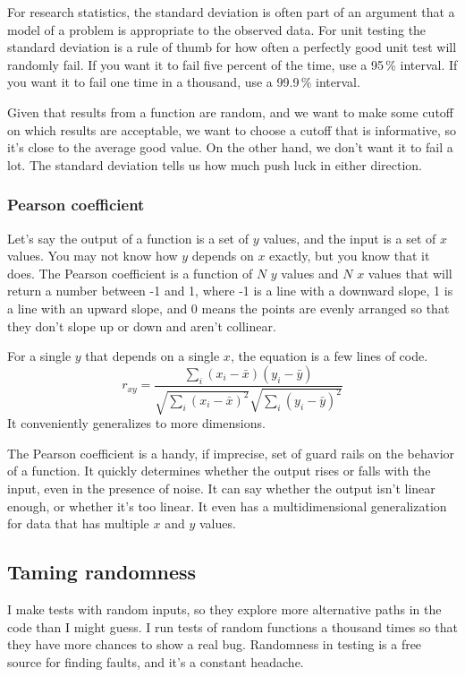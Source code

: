 \documentclass[fleqn,10pt]{olplainarticle}
\begin{document}
For research statistics, the standard deviation is often part
of an argument that a model of a problem is appropriate to
the observed data. For unit testing the standard deviation
is a rule of thumb for how often a perfectly good unit test
will randomly fail. If you want it to fail five percent of
the time, use a 95\,\% interval. If you want it to fail
one time in a thousand, use a 99.9\,\% interval.

Given that results from a function are random, and we
want to make some cutoff on which results are acceptable,
we want to choose a cutoff that is informative, so it's
close to the average good value. On the other hand, we don't
want it to fail a lot. The standard deviation tells us
how much push luck in either direction.

\subsubsection{Pearson coefficient}
Let's say the output of a function is a set of $y$ values,
and the input is a set of $x$ values. You may not know
how $y$ depends on $x$ exactly, but you know that it
does. The Pearson coefficient is a function of
$N$ $y$ values and $N$ $x$ values that will return a number
between -1 and 1, where -1 is a line with a downward slope,
1 is a line with an upward slope, and 0 means the points
are evenly arranged so that they don't slope up or down
and aren't collinear.

For a single $y$ that depends on a single $x$, the equation
is a few lines of code.
\begin{equation}
r_{xy} = \frac{\sum_i (x_i - \bar{x})(y_i - \bar{y})}{\sqrt{\sum_i (x_i - \bar{x})^2}\sqrt{\sum_i(y_i - \bar{y})^2}}
\end{equation}
It conveniently generalizes to more dimensions.

The Pearson coefficient is a handy, if imprecise,
set of guard rails on the behavior of a function.
It quickly determines whether the output rises or falls with the input,
even in the presence of noise. It can say whether the output
isn't linear enough, or whether it's too linear.
It even has a multidimensional generalization for data that
has multiple $x$ and $y$ values.


\subsection{Taming randomness}

I make tests with random inputs, so they explore more alternative
paths in the code than I might guess. I run tests of random
functions a thousand times so that they have more chances to
show a real bug. Randomness in testing is a free source for
finding faults, and it's a constant headache.
\end{document}
